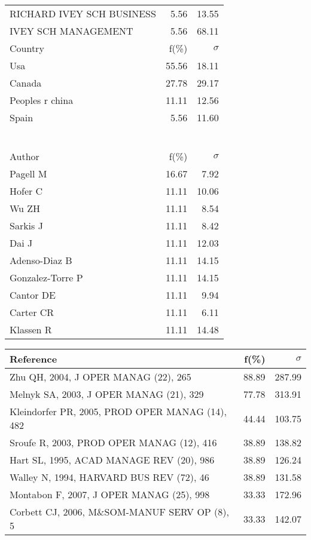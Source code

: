 \documentclass[a4paper,11pt]{report}
\begin{document}
\begin{landscape}
\begin{table}[!ht]
{\begin{tabular}{|l r r|}
RICHARD IVEY SCH BUSINESS & 5.56 & 13.55\\
IVEY SCH MANAGEMENT & 5.56 & 68.11\\
\hline
\hline
Country & f(\%) & $\sigma$\\
\hline
Usa & 55.56 & 18.11\\
Canada & 27.78 & 29.17\\
Peoples r china & 11.11 & 12.56\\
Spain & 5.56 & 11.60\\
 &  & \\
 &  & \\
 &  & \\
 &  & \\
 &  & \\
 &  & \\
\hline
\hline
Author & f(\%) & $\sigma$\\
\hline
Pagell M & 16.67 & 7.92\\
Hofer C & 11.11 & 10.06\\
Wu ZH & 11.11 & 8.54\\
Sarkis J & 11.11 & 8.42\\
Dai J & 11.11 & 12.03\\
Adenso-Diaz B & 11.11 & 14.15\\
Gonzalez-Torre P & 11.11 & 14.15\\
Cantor DE & 11.11 & 9.94\\
Carter CR & 11.11 & 6.11\\
Klassen R & 11.11 & 14.48\\
\hline
\end{tabular}
}
{\scriptsize\begin{tabular}{|l r r|}
\hline
Reference & f(\%) & $\sigma$\\
\hline
Zhu QH, 2004, J OPER MANAG (22), 265 & 88.89 & 287.99\\
Melnyk SA, 2003, J OPER MANAG (21), 329 & 77.78 & 313.91\\
Kleindorfer PR, 2005, PROD OPER MANAG (14), 482 & 44.44 & 103.75\\
Sroufe R, 2003, PROD OPER MANAG (12), 416 & 38.89 & 138.82\\
Hart SL, 1995, ACAD MANAGE REV (20), 986 & 38.89 & 126.24\\
Walley N, 1994, HARVARD BUS REV (72), 46 & 38.89 & 131.58\\
Montabon F, 2007, J OPER MANAG (25), 998 & 33.33 & 172.96\\
Corbett CJ, 2006, M\&SOM-MANUF SERV OP (8), 5 & 33.33 & 142.07\\

\end{tabular}}
\end{table}
\end{landscape}
\end{document}
